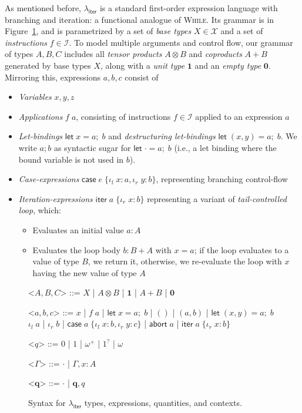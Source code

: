 \documentclass[acmsmall,screen,anonymous,review]{acmart}
\newcommand{\mc}[1]{\ensuremath{\mathcal{#1}}}
\newcommand{\mb}[1]{\ensuremath{\mathbf{#1}}}
\newcommand{\ms}[1]{\ensuremath{\mathsf{#1}}}
\newcommand{\lto}{:}
\newcommand{\linl}[1]{\iota_l\;{#1}}
\newcommand{\linr}[1]{\iota_r\;{#1}}
\newcommand{\labort}[1]{\ms{abort}\;{#1}}
\newcommand{\letexpr}[3]{\ensuremath{\ms{let}\;#1 = #2;\;#3}}
\newcommand{\caseexpr}[5]{\ms{case}\;#1\;\{\linl{#2} \lto #3, \linr{#4} \lto #5\}}
\newcommand{\liter}[3]{\ms{iter}\;#1\;\{ \linr{#2} \lto #3 \}}
\newcommand{\subiterexp}{\texorpdfstring{\(\lambda_{\ms{iter}}\)}{lambda-iter}}
\newcommand{\zeroq}{0}
\newcommand{\oneq}{1}
\newcommand{\delq}{1^?}
\newcommand{\cpyq}{\omega^+}
\newcommand{\topq}{\omega}
\begin{document}
As mentioned before, \subiterexp{} is a standard first-order expression language with branching and
iteration: a functional analogue of \textsc{While}. Its grammar is in
Figure~\ref{fig:expr-syntax}, and is parametrized by a set of \emph{base types} $X \in \mc{X}$ and
a set of \emph{instructions} $f \in \mc{I}$. 
%
To model multiple arguments and control flow, our grammar of types $A,
B, C$ includes all \emph{tensor products} $A \otimes B$ and \emph{coproducts} $A + B$ generated by
base types $X$, along with a \emph{unit type} $\mb{1}$ and an \emph{empty type} $\mb{0}$.
%
Mirroring this, expressions $a, b, c$ consist of
\begin{itemize}
  \item \emph{Variables} $x, y, z$
  \item \emph{Applications} $f\;a$, consisting of instructions $f \in \mc{I}$ applied to an
  expression $a$
  \item \emph{Let-bindings} $\letexpr{x}{a}{b}$ and \emph{destructuring let-bindings} $\letexpr{(x,
  y)}{a}{b}$. We write $a; b$ as syntactic sugar for $\letexpr{\cdot}{a}{b}$ (i.e., a let binding
  where the bound variable is not used in $b$).
  \item \emph{Case-expressions} $\caseexpr{e}{x}{a}{y}{b}$, representing branching control-flow
  \item \emph{Iteration-expressions} $\liter{a}{x}{b}$ representing a variant of
  \emph{tail-controlled loop}, which:
  \begin{itemize}
    \item Evaluates an initial value $a : A$
    \item Evaluates the loop body $b : B + A$ with $x = a$; if the loop evaluates to a value of type
    $B$, we return it, otherwise, we re-evaluate the loop with $x$ having the new value of type $A$
  \end{itemize}
\end{itemize}

\begin{figure}
  \begin{grammar}
    <\(A, B, C\)> ::= 
    \(X\)
    \;|\; \(A \otimes B\)
    \;|\; \(\mathbf{1}\)
    \;|\; \(A + B\)
    \;|\; \(\mathbf{0}\)

    <\(a, b, c\)> ::=
    \(x\)
    \;|\; \(f\;a\)
    \;|\; \(\letexpr{x}{a}{b}\)
    \;|\; \(()\)
    \;|\; \((a, b)\)
    \;|\; \(\letexpr{(x, y)}{a}{b}\)
    \alt  \(\linl{a}\)
    \;|\; \(\linr{b}\)
    \;|\; \(\caseexpr{a}{x}{b}{y}{c}\)
    \;|\; \(\labort{a}\)
    \;|\; \(\liter{a}{x}{b}\)
    
    <\(q\)> ::= \(\zeroq\) | \(\oneq\) | \(\cpyq\) | \(\delq\) | \(\topq\)

    <\(\Gamma\)> ::= \(\cdot\) \;|\; \(\Gamma, x : A\)

    <\(\mb{q}\)> ::= \(\cdot\) \;|\; \(\mb{q}, q\)
  \end{grammar}
  \caption{Syntax for \subiterexp{} types, expressions, quantities, and contexts.} \Description{}
  \label{fig:expr-syntax}
\end{figure}
\end{document}
